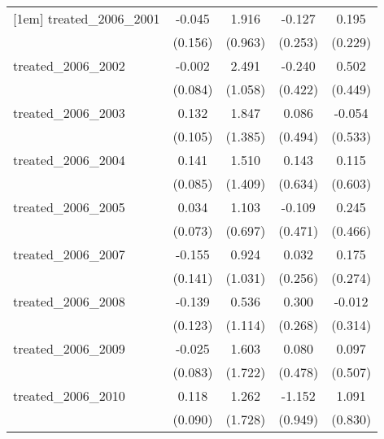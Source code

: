 {\begin{tabular}{l*{4}{c}}
[1em]
treated\_2006\_2001&      -0.045         &       1.916\sym{*}  &      -0.127         &       0.195         \\
            &     (0.156)         &     (0.963)         &     (0.253)         &     (0.229)         \\
[1em]
treated\_2006\_2002&      -0.002         &       2.491\sym{*}  &      -0.240         &       0.502         \\
            &     (0.084)         &     (1.058)         &     (0.422)         &     (0.449)         \\
[1em]
treated\_2006\_2003&       0.132         &       1.847         &       0.086         &      -0.054         \\
            &     (0.105)         &     (1.385)         &     (0.494)         &     (0.533)         \\
[1em]
treated\_2006\_2004&       0.141         &       1.510         &       0.143         &       0.115         \\
            &     (0.085)         &     (1.409)         &     (0.634)         &     (0.603)         \\
[1em]
treated\_2006\_2005&       0.034         &       1.103         &      -0.109         &       0.245         \\
            &     (0.073)         &     (0.697)         &     (0.471)         &     (0.466)         \\
[1em]
treated\_2006\_2007&      -0.155         &       0.924         &       0.032         &       0.175         \\
            &     (0.141)         &     (1.031)         &     (0.256)         &     (0.274)         \\
[1em]
treated\_2006\_2008&      -0.139         &       0.536         &       0.300         &      -0.012         \\
            &     (0.123)         &     (1.114)         &     (0.268)         &     (0.314)         \\
[1em]
treated\_2006\_2009&      -0.025         &       1.603         &       0.080         &       0.097         \\
            &     (0.083)         &     (1.722)         &     (0.478)         &     (0.507)         \\
[1em]
treated\_2006\_2010&       0.118         &       1.262         &      -1.152         &       1.091         \\
            &     (0.090)         &     (1.728)         &     (0.949)         &     (0.830)         \\

\end{tabular}}
